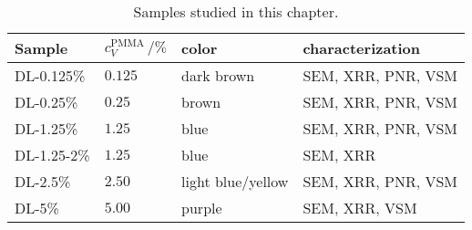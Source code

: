 \documentclass[\main/dresen_thesis.tex]{subfiles}
\begin{document}
  \begin{table}[!htbp]
    \centering
    \caption{\label{tab:doubleLayers:preparation:samples}Samples studied in this chapter.}
    \begin{tabular}{ l | l | l | l}
      \textbf{Sample}  & $c_V^\mathrm{PMMA} \, / \unit{\%} $ & color & characterization\\
      \hline
      DL-0.125\%    & $0.125$ & dark brown      & SEM, XRR, PNR, VSM\\
      DL-0.25\%     & $0.25$ & brown            & SEM, XRR, PNR, VSM\\
      DL-1.25\%     & $1.25$ & blue             & SEM, XRR, PNR, VSM\\
      DL-1.25-2\%   & $1.25$ & blue             & SEM, XRR\\
      DL-2.5\%      & $2.50$ & light blue/yellow& SEM, XRR, PNR, VSM\\
      DL-5\%        & $5.00$ & purple           & SEM, XRR, VSM\\
      \hline
    \end{tabular}
  \end{table}
\end{document}
